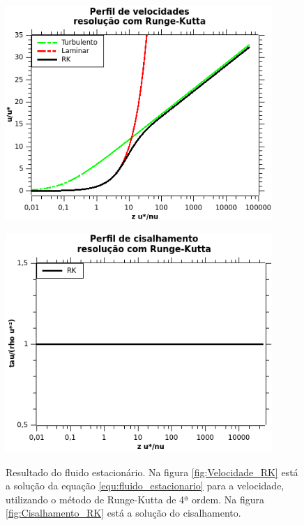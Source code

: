 \begin{figure}
    \centering
    \begin{minipage}{.45\linewidth}
        \includegraphics[width = 0.9\textwidth]{04-figuras/Velocidade_Fluido_RK.png}
        \label{fig:Velocidade_RK}
    \end{minipage}
    \begin{minipage}{.45\linewidth}
        \includegraphics[width = 0.9\textwidth]{04-figuras/Cisalhamento_Fluido_RK.png}
        \label{fig:Cisalhamento_RK}
    \end{minipage}
    \caption{Resultado do fluido estacionário. Na figura \ref{fig:Velocidade_RK} está a solução da equação \ref{equ:fluido_estacionario} para a velocidade, utilizando o método de Runge-Kutta de 4ª ordem. Na figura \ref{fig:Cisalhamento_RK} está a solução do cisalhamento.}
    \label{fig:RK}
\end{figure}

